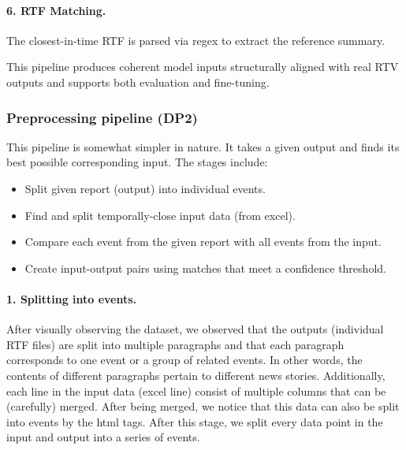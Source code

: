 \paragraph{6. RTF Matching.}
The closest-in-time RTF is parsed via regex to extract the reference summary.

This pipeline produces coherent model inputs structurally aligned with real RTV outputs and supports both evaluation and fine-tuning.



\subsubsection*{Preprocessing pipeline (DP2)}
This pipeline is somewhat simpler in nature.
It takes a given output and finds its best possible corresponding input.
The stages include:
\begin{itemize}
    \item Split given report (output) into individual events.
    \item Find and split temporally-close input data (from excel).
    \item Compare each event from the given report with all events from the input.
    \item Create input-output pairs using matches that meet a confidence threshold.
\end{itemize}

\paragraph{1. Splitting into events.}
After visually observing the dataset, we observed that the outputs (individual RTF files) are split into multiple paragraphs and that each paragraph corresponds to one event or a group of related events.
In other words, the contents of different paragraphs pertain to different news stories.
Additionally, each line in the input data (excel line) consist of multiple columns that can be (carefully) merged.
After being merged, we notice that this data can also be split into events by the html tags.
After this stage, we split every data point in the input and output into a series of events.

